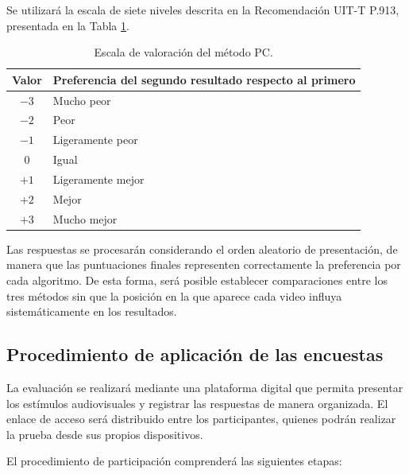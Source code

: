 Se utilizará la escala de siete niveles descrita en la Recomendación UIT-T P.913, presentada en la Tabla \ref{tab:escala_pc}.

\begin{table}[H]
\centering
\caption{Escala de valoración del método PC.}
\label{tab:escala_pc}
\begin{tabular}{|c|p{8cm}|}
\hline
\textbf{Valor} & \textbf{Preferencia del segundo resultado respecto al primero} \\ \hline
$-3$ & Mucho peor \\ \hline
$-2$ & Peor \\ \hline
$-1$ & Ligeramente peor \\ \hline
$0$ & Igual \\ \hline
$+1$ & Ligeramente mejor \\ \hline
$+2$ & Mejor \\ \hline
$+3$ & Mucho mejor \\ \hline
\end{tabular}
\end{table}

Las respuestas se procesarán considerando el orden aleatorio de presentación, de manera que las puntuaciones finales representen correctamente la preferencia por cada algoritmo. De esta forma, será posible establecer comparaciones entre los tres métodos sin que la posición en la que aparece cada video influya sistemáticamente en los resultados.

\subsection{Procedimiento de aplicación de las encuestas}

La evaluación se realizará mediante una plataforma digital que permita presentar los estímulos audiovisuales y registrar las respuestas de manera organizada. El enlace de acceso será distribuido entre los participantes, quienes podrán realizar la prueba desde sus propios dispositivos.

El procedimiento de participación comprenderá las siguientes etapas:

